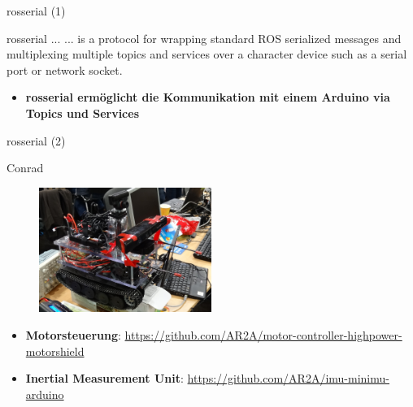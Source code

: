 \documentclass{beamer}
\begin{document}
\begin{frame}{rosserial (1)}
\begin{alertblock}{rosserial ...}
... is a protocol for wrapping standard ROS serialized messages and multiplexing multiple topics and services over a character device such as a serial port or network socket.
\end{alertblock}
\begin{itemize}
	\item \textbf{rosserial erm\"oglicht die Kommunikation mit einem Arduino via Topics und Services}
\end{itemize}
\end{frame}
\begin{frame}{rosserial (2)}
	
\end{frame}
\begin{frame}{Conrad}
\begin{figure}[H]
	\centering
	\includegraphics[width=0.5\textwidth]{./images/robot-conrad.jpg}
\end{figure}
\begin{itemize}
	\item \textbf{Motorsteuerung}: \url{https://github.com/AR2A/motor-controller-highpower-motorshield}
\end{itemize}
\begin{itemize}
	\item \textbf{Inertial Measurement Unit}: \url{https://github.com/AR2A/imu-minimu-arduino}
\end{itemize}
\end{frame}
\end{document}
